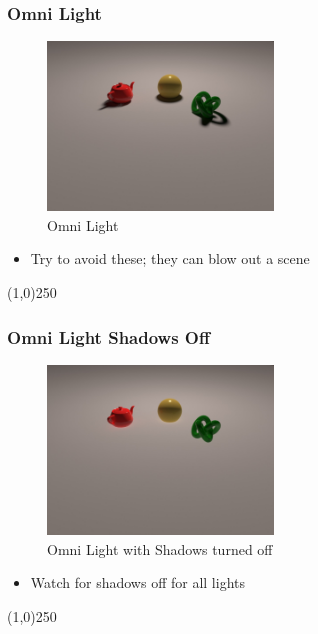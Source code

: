 \begin{frame}
	\frametitle{Omni Light}
	\begin{figure}
		\centering
		\includegraphics[height=4.5cm]{./Lights/OmniLight}
		\caption{Omni Light}
		\label{fig:OmniLight}
	\end{figure}
	\begin{itemize}
		\item Try to avoid these; they can blow out a scene
	\end{itemize}
\end{frame}
\begin{center}\line(1,0){250}\end{center}


\begin{frame}
	\frametitle{Omni Light Shadows Off}
	\begin{figure}
		\centering
		\includegraphics[height=4.5cm]{./Lights/OmniLightShadowsOff}
		\caption{Omni Light with Shadows turned off}
		\label{fig:OmniLightShadowsOff}
	\end{figure}
	\begin{itemize}
		\item Watch for shadows off for all lights
	\end{itemize}
\end{frame}
\begin{center}\line(1,0){250}\end{center}



